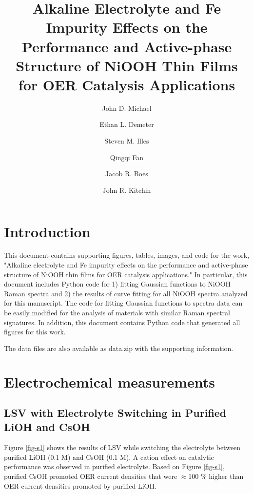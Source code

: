 \documentclass[journal=jpccck,manuscript=suppinfo,email=true]{achemso}
\author{John D. Michael}
\author{Ethan L. Demeter}
\author{Steven M. Illes}
\author{Qingqi Fan}
\author{Jacob R. Boes}
\author{John R. Kitchin}
\affiliation{Department of Chemical Engineering, Carnegie Mellon University, 5000 Forbes Ave, Pittsburgh, PA 15213}
\date{}
\title{Alkaline Electrolyte and Fe Impurity Effects on the Performance and Active-phase Structure of NiOOH Thin Films for OER Catalysis Applications}
\begin{document}
\newpage
\maketitle
\raggedbottom
\tableofcontents

\section{Introduction}
\label{sec-1}
This document contains supporting figures, tables, images, and code for the work, "Alkaline electrolyte and Fe impurity effects on the performance and active-phase structure of NiOOH thin films for OER catalysis applications." In particular, this document includes Python code for 1) fitting Gaussian functions to NiOOH Raman spectra and 2) the results of curve fitting for all NiOOH spectra analyzed for this manuscript. The code for fitting Gaussian functions to spectra data can be easily modified for the analysis of materials with similar Raman spectral signatures. In addition, this document contains Python code that generated all figures for this work.

The data files are also available as data.zip with the supporting information.

\section{Electrochemical measurements}
\label{sec-2}
\subsection{LSV with Electrolyte Switching in Purified LiOH and CsOH}
\label{sec-2-1}
Figure \ref{fig-s1} shows the results of LSV while switching the electrolyte between purified LiOH (0.1 M) and CsOH (0.1 M). A cation effect on catalytic performance was observed in purified electrolyte. Based on Figure \ref{fig-s1}, purified CsOH promoted OER current densities that were $\approx$100 \% higher than OER current densities promoted by purified LiOH.
\end{document}
